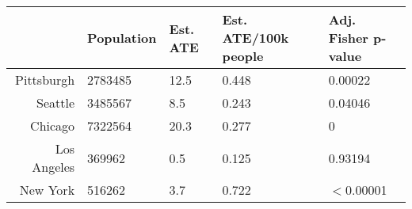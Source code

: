 \begin{table}[ht]
\centering
\begin{tabular}{rllll}
  \hline
 & Population & Est. ATE & Est. ATE/100k people & Adj. Fisher p-value \\ 
  \hline
Pittsburgh & 2783485 & 12.5 & 0.448 & 0.00022 \\ 
  Seattle & 3485567 &  8.5 & 0.243 & 0.04046 \\ 
  Chicago & 7322564 & 20.3 & 0.277 & 0 \\ 
  Los Angeles &  369962 &  0.5 & 0.125 & 0.93194 \\ 
  New York &  516262 &  3.7 & 0.722 & $<$0.00001 \\ 
   \hline
\end{tabular}
\end{table}
